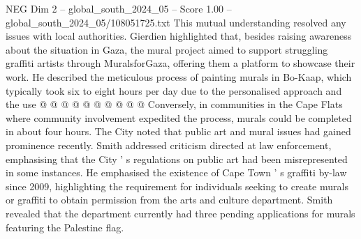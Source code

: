 \begin{textsample}{NEG Dim 2 – global\_south\_2024\_05 – Score 1.00 – global\_south\_2024\_05/108051725.txt}
This mutual understanding resolved any issues with local authorities.
Gierdien highlighted that, besides raising awareness about the situation in Gaza, the mural project aimed to support struggling graffiti artists through MuralsforGaza, offering them a platform to showcase their work.
He described the meticulous process of painting murals in Bo-Kaap, which typically took six to eight hours per day due to the personalised approach and the use @ @ @ @ @ @ @ @ @ @ Conversely, in communities in the Cape Flats where community involvement expedited the process, murals could be completed in about four hours.
The City noted that public art and mural issues had gained prominence recently.
Smith addressed criticism directed at law enforcement, emphasising that the City ' s regulations on public art had been misrepresented in some instances.
He emphasised the existence of Cape Town ' s graffiti by-law since 2009, highlighting the requirement for individuals seeking to create murals or graffiti to obtain permission from the arts and culture department.
Smith revealed that the department currently had three pending applications for murals featuring the Palestine flag.

\end{textsample}
